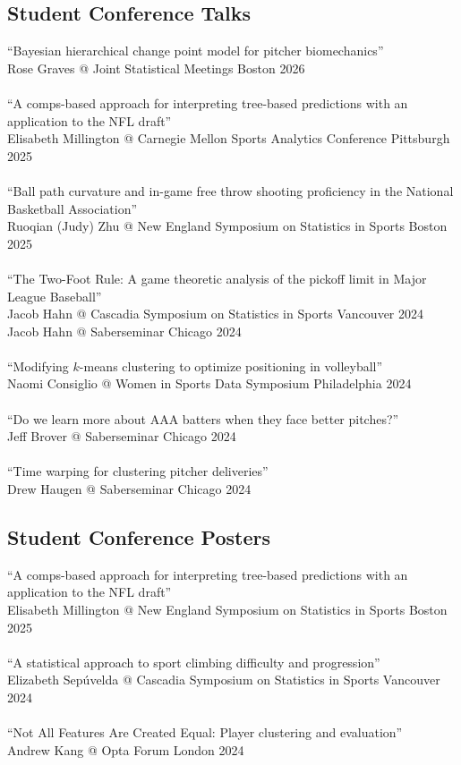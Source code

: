 \documentclass{article}
\begin{document}
\subsection*{\sc Student Conference Talks}

``Bayesian hierarchical change point model for pitcher biomechanics''\\
Rose Graves @ Joint Statistical Meetings \hfill Boston 2026\\
~\\
``A comps-based approach for interpreting tree-based predictions with an application to the NFL draft''\\
Elisabeth Millington @ Carnegie Mellon Sports Analytics Conference \hfill Pittsburgh 2025\\
~\\
``Ball path curvature and in-game free throw shooting proficiency in the National Basketball Association''\\
Ruoqian (Judy) Zhu @ New England Symposium on Statistics in Sports \hfill Boston 2025\\
~\\
``The Two-Foot Rule: A game theoretic analysis of the pickoff limit in Major League Baseball''\\
Jacob Hahn @ Cascadia Symposium on Statistics in Sports \hfill Vancouver 2024\\
Jacob Hahn @ Saberseminar \hfill Chicago 2024\\
~\\
``Modifying $k$-means clustering to optimize positioning in volleyball''\\
Naomi Consiglio @ Women in Sports Data Symposium \hfill Philadelphia 2024\\
~\\
``Do we learn more about AAA batters when they face better pitches?''\\
Jeff Brover @ Saberseminar \hfill Chicago 2024\\
~\\
``Time warping for clustering pitcher deliveries''\\
Drew Haugen @ Saberseminar \hfill Chicago 2024

\subsection*{\sc Student Conference Posters}

``A comps-based approach for interpreting tree-based predictions with an application to the NFL draft''\\
Elisabeth Millington @ New England Symposium on Statistics in Sports \hfill Boston 2025\\
~\\
``A statistical approach to sport climbing difficulty and progression''\\
Elizabeth Sep\'uvelda @ Cascadia Symposium on Statistics in Sports \hfill Vancouver 2024\\
~\\
``Not All Features Are Created Equal: Player clustering and evaluation''\\
Andrew Kang @ Opta Forum \hfill London 2024
\end{document}
